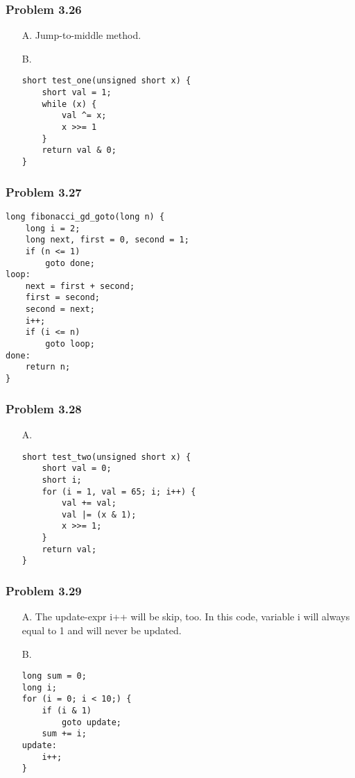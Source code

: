 \documentclass[a4paper]{article}
\begin{document}
\subsubsection*{Problem 3.26}
\begin{enumerate}
    \item [A.] Jump-to-middle method.
    \item [B.] 
    \begin{lstlisting}
short test_one(unsigned short x) {
    short val = 1;
    while (x) {
        val ^= x;
        x >>= 1
    }
    return val & 0;
}
    \end{lstlisting}
\end{enumerate}

\subsubsection*{Problem 3.27}
\begin{lstlisting}
long fibonacci_gd_goto(long n) {
    long i = 2;
    long next, first = 0, second = 1;
    if (n <= 1) 
        goto done;
loop:
    next = first + second;
    first = second;
    second = next;
    i++;
    if (i <= n) 
        goto loop;
done:
    return n;
}
\end{lstlisting}

\subsubsection*{Problem 3.28}
\begin{enumerate}
    \item [A.]
\begin{lstlisting}
short test_two(unsigned short x) {
    short val = 0;
    short i;
    for (i = 1, val = 65; i; i++) {
        val += val;
        val |= (x & 1);
        x >>= 1;
    }
    return val;
}
\end{lstlisting}
\end{enumerate}

\subsubsection*{Problem 3.29}
\begin{enumerate}
    \item [A.] The update-expr i++ will be skip, too. In this code, variable i will always equal to 1 and will never be updated.
    \item [B.]
\begin{lstlisting}
long sum = 0;
long i;
for (i = 0; i < 10;) {
    if (i & 1)
        goto update;
    sum += i;
update:
    i++;
}
\end{lstlisting}
\end{enumerate}
\end{document}
